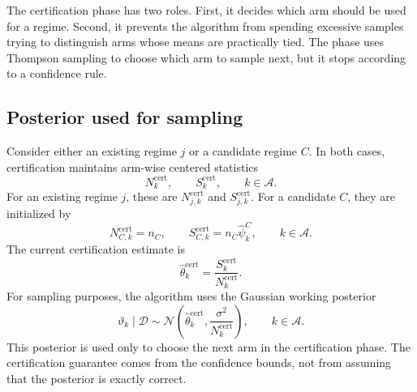 \documentclass[11pt]{article}
\newcommand{\A}{\mathcal A}
\begin{document}
The certification phase has two roles. First, it decides which arm should be used for a regime. Second, it prevents the algorithm from spending excessive samples trying to distinguish arms whose means are practically tied. The phase uses Thompson sampling to choose which arm to sample next, but it stops according to a confidence rule.

\subsection{Posterior used for sampling}

Consider either an existing regime $j$ or a candidate regime $C$. In both cases, certification maintains arm-wise centered statistics
\begin{equation}
    N_k^{\mathrm{cert}},
    \qquad
    S_k^{\mathrm{cert}},
    \qquad k\in\A.
\end{equation}
For an existing regime $j$, these are $N_{j,k}^{\mathrm{cert}}$ and $S_{j,k}^{\mathrm{cert}}$. For a candidate $C$, they are initialized by
\begin{equation}
    N_{C,k}^{\mathrm{cert}}=n_C,
    \qquad
    S_{C,k}^{\mathrm{cert}}=n_C\widehat\psi_k^C,
    \qquad k\in\A.
    \label{eq:candidate-cert-init}
\end{equation}
The current certification estimate is
\begin{equation}
    \widehat\theta_k^{\mathrm{cert}}
    =
    \frac{S_k^{\mathrm{cert}}}{N_k^{\mathrm{cert}}}.
    \label{eq:local-cert-estimate}
\end{equation}
For sampling purposes, the algorithm uses the Gaussian working posterior
\begin{equation}
    \vartheta_k
    \mid \mathcal D
    \sim
    \mathcal N\!\left(
    \widehat\theta_k^{\mathrm{cert}},
    \frac{\sigma^2}{N_k^{\mathrm{cert}}}
    \right),
    \qquad k\in\A.
    \label{eq:working-posterior}
\end{equation}
This posterior is used only to choose the next arm in the certification phase. The certification guarantee comes from the confidence bounds, not from assuming that the posterior is exactly correct.
\end{document}
